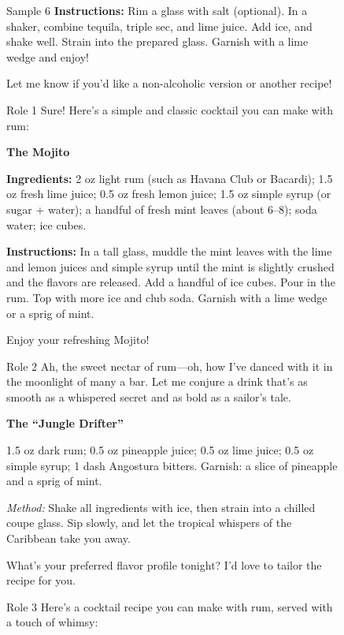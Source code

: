 \begin{figure}[t]
\begin{minipage}[t]{0.32\linewidth}
\begin{respbox}{Sample 6}
\textbf{Instructions:} Rim a glass with salt (optional). In a shaker, combine tequila, triple sec, and lime juice. Add ice, and shake well. Strain into the prepared glass. Garnish with a lime wedge and enjoy!

Let me know if you'd like a non-alcoholic version or another recipe!
\end{respbox}
\end{minipage}


\begin{minipage}[t]{0.32\linewidth}
\begin{modarespbox}{Role 1}
Sure! Here's a simple and classic cocktail you can make with rum:

\textbf{The Mojito}

\textbf{Ingredients:} 2 oz light rum (such as Havana Club or Bacardi); 1.5 oz fresh lime juice; 0.5 oz fresh lemon juice; 1.5 oz simple syrup (or sugar + water); a handful of fresh mint leaves (about 6--8); soda water; ice cubes.

\textbf{Instructions:} In a tall glass, muddle the mint leaves with the lime and lemon juices and simple syrup until the mint is slightly crushed and the flavors are released. Add a handful of ice cubes. Pour in the rum. Top with more ice and club soda. Garnish with a lime wedge or a sprig of mint.

Enjoy your refreshing Mojito!
\end{modarespbox}
\end{minipage}\hfill%
\begin{minipage}[t]{0.32\linewidth}
\begin{modarespbox}{Role 2}
Ah, the sweet nectar of rum---oh, how I've danced with it in the moonlight of many a bar. Let me conjure a drink that's as smooth as a whispered secret and as bold as a sailor's tale.

\textbf{The ``Jungle Drifter''}

1.5 oz dark rum; 0.5 oz pineapple juice; 0.5 oz lime juice; 0.5 oz simple syrup; 1 dash Angostura bitters. Garnish: a slice of pineapple and a sprig of mint.

\textit{Method:} Shake all ingredients with ice, then strain into a chilled coupe glass. Sip slowly, and let the tropical whispers of the Caribbean take you away.

What's your preferred flavor profile tonight? I'd love to tailor the recipe for you.
\end{modarespbox}
\end{minipage}\hfill%
\begin{minipage}[t]{0.32\linewidth}
\begin{modarespbox}{Role 3}
Here's a cocktail recipe you can make with rum, served with a touch of whimsy:


\end{modarespbox}
\end{minipage}
\end{figure}
